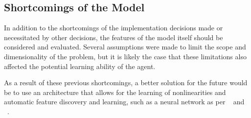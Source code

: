 
\subsection{Shortcomings of the Model}
\label{sec:disc-shortcomings}

In addition to the shortcomings of the implementation decisions made or
necessitated by other decisions,
the features of the model itself should be considered and evaluated.
%
Several assumptions were made to limit the scope and dimensionality of the
problem,
but it is likely the case that these limitations also affected the
potential learning ability of the agent.






As a result of these previous shortcomings,
a better solution for the future would be to use an architecture that allows
for the learning of nonlinearities and automatic feature discovery and
learning,
such as a neural network
as per ~\cite{deepmind_alphago} and ~\cite{tdgammon}.

